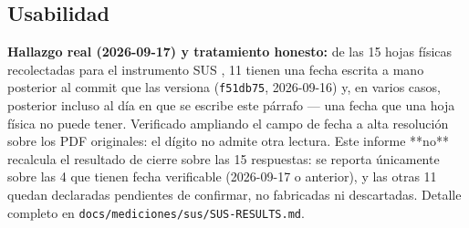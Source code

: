 \subsection{Usabilidad}

\textbf{Hallazgo real (2026-09-17) y tratamiento honesto:} de las 15 hojas físicas recolectadas para el
instrumento SUS \cite{brooke1996}, 11 tienen una fecha escrita a mano posterior al commit que las
versiona (\texttt{f51db75}, 2026-09-16) y, en varios casos, posterior incluso al día en que se escribe
este párrafo --- una fecha que una hoja física no puede tener. Verificado ampliando el campo de fecha a
alta resolución sobre los PDF originales: el dígito no admite otra lectura. Este informe **no** recalcula
el resultado de cierre sobre las 15 respuestas: se reporta únicamente sobre las 4 que tienen fecha
verificable (2026-09-17 o anterior), y las otras 11 quedan declaradas pendientes de confirmar, no
fabricadas ni descartadas. Detalle completo en \texttt{docs/mediciones/sus/SUS-RESULTS.md}.

